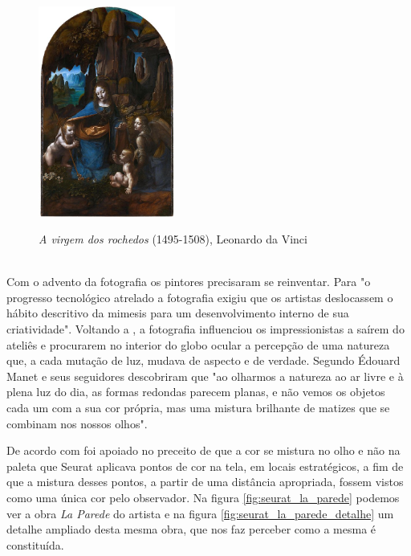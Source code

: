 \begin{figure}[H]
    \centering
    \caption{\textit{A virgem dos rochedos} (1495-1508), Leonardo da Vinci}
	\vspace*{0,2cm}
    \includegraphics[width=0.4\textwidth]{./04-figuras/da_vinci_virgem_rochedos}
    \label{fig:da_vinci_virgem_rochedos}
\end{figure}
\vspace*{-0,9cm}
{\raggedright {}}\\


Com o advento da fotografia os pintores precisaram se reinventar. Para  "o progresso tecnológico atrelado a fotografia exigiu que os artistas deslocassem o hábito descritivo da mimesis para um desenvolvimento interno de sua criatividade". Voltando a , a fotografia influenciou os impressionistas a saírem do ateliês e procurarem no interior do globo ocular a percepção de uma natureza que, a cada mutação de luz, mudava de aspecto e de verdade. Segundo  Édouard Manet e seus seguidores descobriram que "ao olharmos a natureza ao ar livre e à plena luz do dia, as formas redondas parecem planas, e não vemos os objetos cada um com a sua cor própria, mas uma mistura brilhante de matizes que se combinam nos nossos olhos".


De acordo com  foi apoiado no preceito de que a cor se mistura no olho e não na paleta que Seurat aplicava pontos de cor na tela, em locais estratégicos, a fim de que a mistura desses pontos, a partir de uma distância apropriada, fossem vistos como uma única cor pelo observador. Na figura \ref{fig:seurat_la_parede} podemos ver a obra  \textit{La Parede} do artista e na figura \ref{fig:seurat_la_parede_detalhe} um detalhe ampliado desta mesma obra, que nos faz perceber como a mesma é constituída.

